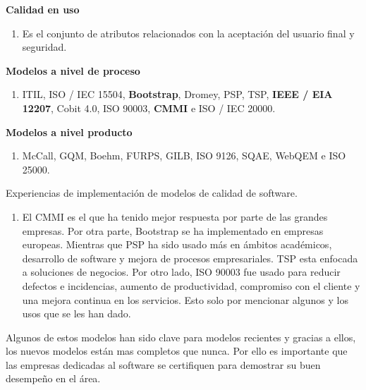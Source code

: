 \documentclass{article} %
\begin{document}
\noindent \textbf{Calidad en uso}

\begin{enumerate}
\item \textbf{ }Es el conjunto de atributos relacionados con la aceptaci\'{o}n del usuario final y seguridad.
\end{enumerate}

\noindent \textbf{Modelos a nivel de proceso}

\begin{enumerate}
\item \textbf{ }ITIL, ISO / IEC 15504, \textbf{Bootstrap}, Dromey, PSP, TSP, \textbf{IEEE / EIA 12207}, Cobit 4.0, ISO 90003, \textbf{CMMI} e ISO / IEC 20000.
\end{enumerate}

\noindent \textbf{Modelos a nivel producto}

\begin{enumerate}
\item \textbf{ }McCall, GQM, Boehm, FURPS, GILB, ISO 9126, SQAE, WebQEM e ISO 25000.
\end{enumerate}

\noindent Experiencias de implementaci\'{o}n de modelos de calidad de software.

\begin{enumerate}
\item  El CMMI es el que ha tenido mejor respuesta por parte de las grandes empresas. Por otra parte, Bootstrap se ha implementado en empresas europeas. Mientras que PSP ha sido usado m\'{a}s en \'{a}mbitos acad\'{e}micos, desarrollo de software y mejora de procesos empresariales. TSP esta enfocada a soluciones de negocios. Por otro lado, ISO 90003 fue usado para reducir defectos e incidencias, aumento de productividad, compromiso con el cliente y una mejora continua en los servicios.  Esto solo por mencionar algunos y los usos que se les han dado.
\end{enumerate}

\noindent Algunos de estos modelos han sido clave para modelos recientes y gracias a ellos, los nuevos modelos est\'{a}n mas completos que nunca. Por ello es importante que las empresas dedicadas al software se certifiquen para demostrar su buen desempe\~{n}o en el \'{a}rea. 

\noindent 
\end{document}
